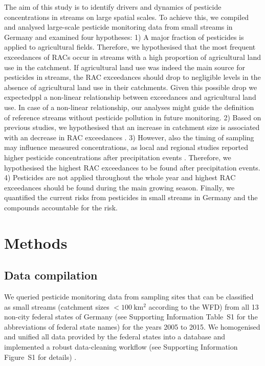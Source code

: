 \documentclass[journal=esthag,manuscript=article]{achemso}
\begin{document}
The aim of this study is to identify drivers and dynamics of pesticide concentrations in streams on large spatial scales.
To achieve this, we compiled and analysed large-scale pesticide monitoring data from small streams in Germany and examined four hypotheses:
1) A major fraction of pesticides is applied to agricultural fields.
Therefore, we hypothesised that the most frequent exceedances of RACs occur in streams with a high proportion of agricultural land use in the catchment. 
If agricultural land use was indeed the main source for pesticides in streams, the RAC exceedances should drop to negligible levels in the absence of agricultural land use in their catchments. 
Given this possible drop we expectedppl a non-linear relationship between exceedances and agricultural land use.
In case of a non-linear relationship, our analyses might guide the definition of reference streams without pesticide pollution in future monitoring. 
2) Based on previous studies, we hypothesised that an increase in catchment size is associated with an decrease in RAC exceedances \citep{stehle_pesticide_2015,schulz_field_2004}. 
3) However, also the timing of sampling may influence measured concentrations,
as local and regional studies reported higher pesticide concentrations after precipitation events \citep{liess_determination_1999,Xing_Chow_Rees_Meng_Li_Ernst_Benoy_Zha_Hewitt_2013}. 
Therefore, we hypothesised the highest RAC exceedances to be found after precipitation events. 
4) Pesticides are not applied throughout the whole year and highest RAC exceedances should be found during the main growing season.
Finally, we quantified the current risks from pesticides in small streams in Germany and the compounds accountable for the risk. 



\section{Methods}
\subsection{Data compilation}
We queried pesticide monitoring data from sampling sites that can be classified as small streams (catchment sizes $\mathrm{< 100~km^2}$ according to the WFD) from all 13 non-city federal states of Germany (see Supporting Information Table~S1 for the abbreviations of federal state names) for the years 2005 to 2015.
We homogenised and unified all data provided by the federal states into a database and implemented a robust data-cleaning workflow (see Supporting Information Figure~S1 for details) \citep{poisot_best_2015}.
\end{document}

